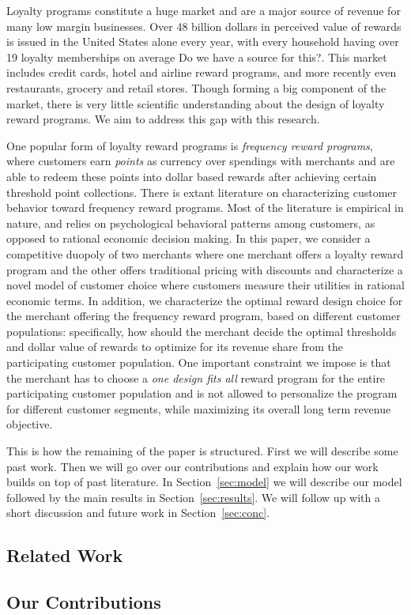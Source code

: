 Loyalty programs constitute a huge market and are a major source of revenue for many low margin businesses.
Over 48 billion dollars in perceived value of rewards is issued in the United States alone every year, with every household having over 19 loyalty memberships on average {\nolan Do we have a source for this?}.
This market includes credit cards, hotel and airline reward programs, and more recently even restaurants, grocery and retail stores.
Though forming a big component of the market, there is very little scientific understanding about the design of loyalty reward programs. We aim to address this gap with this research.

One popular form of loyalty reward programs is \emph{frequency reward programs}, where customers earn \emph{points} as currency over spendings with merchants and are able to redeem these points into dollar based rewards after achieving certain threshold point collections.
There is extant literature on characterizing customer behavior toward frequency reward programs.
Most of the literature is empirical in nature, and relies on psychological behavioral patterns among customers, as opposed to rational economic decision making.
In this paper, we consider a competitive duopoly of two merchants where one merchant offers a loyalty reward program and the other offers traditional pricing with discounts and characterize a novel model of customer choice where customers measure their utilities in rational economic terms.
In addition, we characterize the optimal reward design choice for the merchant offering the frequency reward program, based on different customer populations: specifically, how should the merchant decide the optimal thresholds and dollar value of rewards to optimize for its revenue share from the participating customer population.
One important constraint we impose is that the merchant has to choose a \emph{one design fits all} reward program for the entire participating customer population and is not allowed to personalize the program for different customer segments, while maximizing its overall long term revenue objective.

This is how the remaining of the paper is structured. First we will describe some past work. Then we will go over our contributions and explain how our work builds on top of past literature. In Section~\ref{sec:model} we will describe our model followed by the main results in Section~\ref{sec:results}. We will follow up with a short discussion and future work in Section~\ref{sec:conc}.

\subsection{Related Work}


\subsection{Our Contributions}

